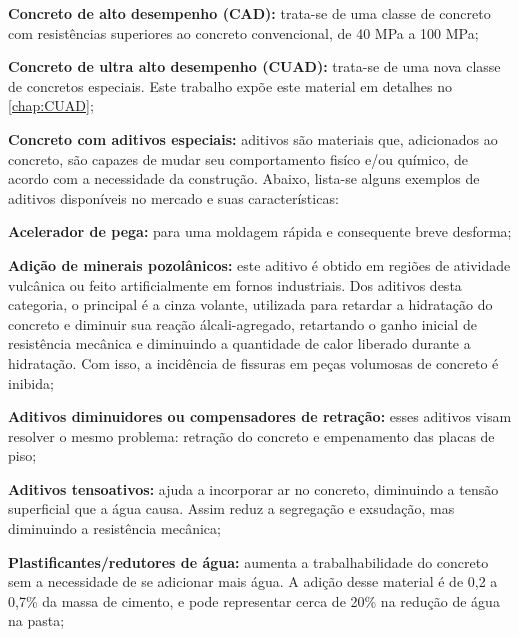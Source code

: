 \begin{alineas} %
  \item \textbf{Concreto de alto desempenho (CAD):} trata-se de uma classe de concreto com resistências superiores ao concreto convencional, de 40 MPa a 100 MPa;
  
  \item \textbf{Concreto de ultra alto desempenho (CUAD):} trata-se de uma nova classe de concretos especiais. Este trabalho expõe este material em detalhes no \autoref{chap:CUAD};
  
  \item \textbf{Concreto com aditivos especiais:} aditivos são materiais que, adicionados ao concreto, são capazes de mudar seu comportamento fisíco e/ou químico, de acordo com a necessidade da construção. Abaixo, lista-se alguns exemplos de aditivos disponíveis no mercado e suas características:
    \begin{incisos}
      \item \textbf{Acelerador de pega:} para uma moldagem rápida e consequente breve desforma;
      
      \item \textbf{Adição de minerais pozolânicos:} este aditivo é obtido em regiões de atividade vulcânica ou feito artificialmente em fornos industriais. Dos aditivos desta categoria, o principal é a cinza volante, utilizada para retardar a hidratação do concreto e diminuir sua reação álcali-agregado, retartando o ganho inicial de resistência mecânica e diminuindo a quantidade de calor liberado durante a hidratação. Com isso, a incidência de fissuras em peças volumosas de concreto é inibida;
      
      \item \textbf{Aditivos diminuidores ou compensadores de retração:} esses aditivos visam resolver o mesmo problema: retração do concreto e empenamento das placas de piso;
      
      \item \textbf{Aditivos tensoativos:} ajuda a incorporar ar no concreto, diminuindo a tensão superficial que a água causa. Assim reduz a segregação e exsudação, mas diminuindo a resistência mecânica;
      
      \item \textbf{Plastificantes/redutores de água:} aumenta a trabalhabilidade do concreto sem a necessidade de se adicionar mais água. A adição desse material é de 0,2 a 0,7\% da massa de cimento, e pode representar cerca de 20\% na redução de água na pasta;
      

\end{incisos}
\end{alineas}
